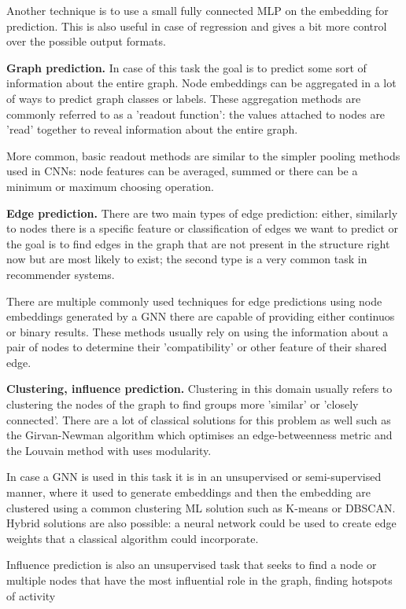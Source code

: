 	Another technique is to use a small fully connected MLP on the embedding for prediction. This is also useful in case of regression and gives a bit more control over the possible output formats. 
	
	\textbf{Graph prediction.} In case of this task the goal is to predict some sort of information about the entire graph. Node embeddings can be aggregated in a lot of ways to predict graph classes or labels. These aggregation methods are commonly referred to as a 'readout function': the values attached to nodes are 'read' together to reveal information about the entire graph.
	
	More common, basic readout methods are similar to the simpler pooling methods used in CNNs: node features can be averaged, summed or there can be a minimum or maximum choosing operation. 
	
	\textbf{Edge prediction.} There are two main types of edge prediction: either, similarly to nodes there is a specific feature or classification of edges we want to predict or the goal is to find edges in the graph that are not present in the structure right now but are most likely to exist; the second type is a very common task in recommender systems.
	
	There are multiple commonly used techniques for edge predictions using node embeddings generated by a GNN there are capable of providing either continuos or binary results. These methods usually rely on using the information about a pair of nodes to determine their 'compatibility' or other feature of their shared edge.
	
	\textbf{Clustering, influence prediction.} Clustering in this domain usually refers to clustering the nodes of the graph to find groups more 'similar' or 'closely connected'. There are a lot of classical solutions for this problem as well such as the Girvan-Newman algorithm which optimises an edge-betweenness metric and the Louvain method with uses modularity. 
	
	In case a GNN is used in this task it is in an unsupervised or semi-supervised manner, where it used to generate embeddings and then the embedding are clustered using a common clustering ML solution such as K-means or DBSCAN. Hybrid solutions are also possible: a neural network could be used to create edge weights that a classical algorithm could incorporate.
	
	Influence prediction is also an unsupervised task that seeks to find a node or multiple nodes that have the most influential role in the graph, finding hotspots of activity
	
